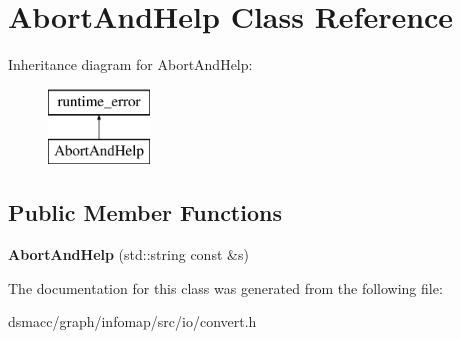 \hypertarget{classAbortAndHelp}{}\section{Abort\+And\+Help Class Reference}
\label{classAbortAndHelp}
Inheritance diagram for Abort\+And\+Help\+:\begin{figure}[H]
\begin{center}
\leavevmode
\includegraphics[height=2.000000cm]{classAbortAndHelp}
\end{center}
\end{figure}
\subsection*{Public Member Functions}
\begin{DoxyCompactItemize}
\item 
\mbox{\label{classAbortAndHelp_a4f1de95801111bd5b7bab74ac3982136}} 
{\bfseries Abort\+And\+Help} (std\+::string const \&s)
\end{DoxyCompactItemize}


The documentation for this class was generated from the following file\+:\begin{DoxyCompactItemize}
\item 
dsmacc/graph/infomap/src/io/convert.\+h\end{DoxyCompactItemize}
